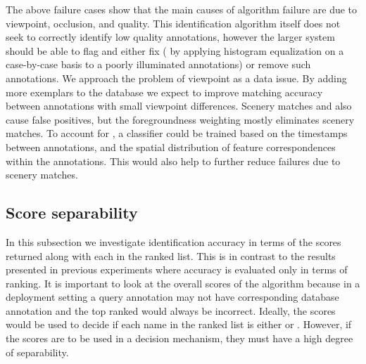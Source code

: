         The above failure cases show that the main causes of algorithm failure are due to viewpoint, occlusion,
          and quality.
        This identification algorithm itself does not seek to correctly identify low quality annotations, however
          the larger system should be able to flag and either fix (\eg{} by applying histogram equalization on a
          case-by-case basis to a poorly illuminated annotations) or remove such annotations.
        We approach the problem of viewpoint as a data issue.
        By adding more exemplars to the database we expect to improve matching accuracy between annotations with
          small viewpoint differences.
        Scenery matches and \photobombings{} also cause false positives, but the foregroundness weighting mostly
          eliminates scenery matches.
        To account for \photobombings{}, a classifier could be trained based on the timestamps between
          annotations, and the spatial distribution of feature correspondences within the annotations.
        This would also help to further reduce failures due to scenery matches.
        


    \subsection{Score separability}\label{sub:exptsep}  

        In this subsection we investigate identification accuracy in terms of the scores returned along with each
          \name{} in the ranked list.
        This is in contrast to the results presented in previous experiments where accuracy is evaluated only in
          terms of ranking.
        It is important to look at the overall scores of the algorithm because in a deployment setting a query
          annotation may not have corresponding \groundtrue{} database annotation and the top ranked \name{} would
          always be incorrect.
        Ideally, the scores would be used to decide if each name in the ranked list is either \groundtrue{} or
          \groundfalse{}.
        However, if the scores are to be used in a decision mechanism, they must have a high degree of
          separability.

